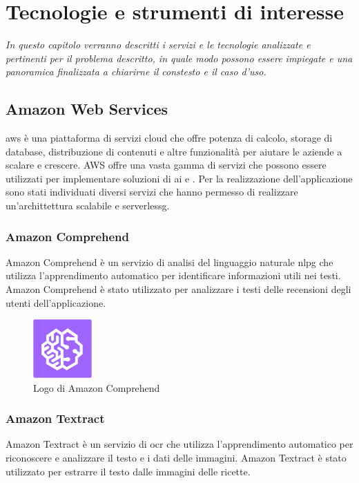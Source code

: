 \chapter{Tecnologie e strumenti di interesse}
\label{cap:tecnologie}
\emph{In questo capitolo verranno descritti i servizi e le tecnologie analizzate e pertinenti per il problema descritto, in quale modo possono essere impiegate e una panoramica finalizzata a chiarirne il constesto e il caso d'uso.}

\section{Amazon Web Services}
\gls{aws} è una piattaforma di servizi cloud che offre potenza di calcolo, storage di database, distribuzione di contenuti e altre funzionalità per aiutare le aziende a scalare e crescere. AWS offre una vasta gamma di servizi che possono essere utilizzati per implementare soluzioni di \gls{ai} e . Per la realizzazione dell'applicazione sono stati individuati diversi servizi che hanno permesso di realizzare un'archittettura scalabile e \gls{serverlessg}.

\subsection{Amazon Comprehend}
Amazon Comprehend è un servizio di analisi del linguaggio naturale \gls{nlpg} che utilizza l'apprendimento automatico per identificare informazioni utili nei testi. Amazon Comprehend è stato utilizzato per analizzare i testi delle recensioni degli utenti dell'applicazione.

\begin{figure}[h]
  \centering
  \includegraphics[width=0.2\textwidth]{img/tecnologie/comprehend.png}
  \caption{Logo di Amazon Comprehend}
  \label{fig:comprehend}
\end{figure}

\subsection{Amazon Textract}
Amazon Textract è un servizio di \gls{ocr} che utilizza l'apprendimento automatico per riconoscere e analizzare il testo e i dati delle immagini. Amazon Textract è stato utilizzato per estrarre il testo dalle immagini delle ricette.

